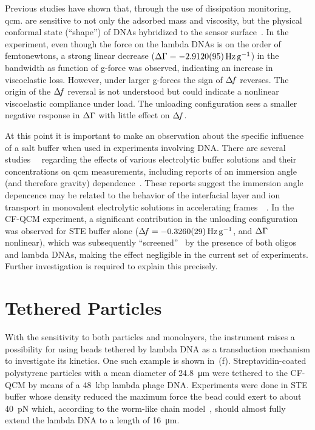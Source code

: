 Previous studies have shown that, through the use of dissipation
monitoring, \gls{qcm}. are sensitive to not only the adsorbed mass and viscosity,
but the physical conformal state (``shape'') of DNAs hybridized to the
sensor surface~\cite{tsortos2008shear}.  In the experiment, even though the
force on the lambda DNAs is on the order of femtonewtons, a strong linear
decrease ($\dg=\SI{-2.912+-0.0095}{\hertz\per\g}$) in the bandwidth as
function of g-force was observed, indicating an increase in viscoelastic
loss.  However, under larger g-forces the sign of $\Delta\!f$ reverses.  The
origin of the $\Delta\!f$ reversal is not understood but could indicate a
nonlinear viscoelastic compliance under load.  The unloading configuration
sees a smaller negative response in $\Delta\Gamma$ with little effect on $\Delta\!f$.

At this point it is important to make an observation about the specific
influence of a salt buffer when used in experiments involving DNA\@.  There
are several studies~\cite{encarnaccao2007influence}~\cite{lin1995role}
regarding the effects of various electrolytic buffer solutions and their
concentrations on \gls{qcm} measurements, including reports of an immersion angle
(and therefore gravity) dependence~\cite{yoshimoto2006characteristics}.  These
reports suggest the immersion angle depencence may be related to the behavior
of the interfacial layer and ion transport in monovalent electrolytic
solutions in accelerating
frames~\cite{tolman1911electromotive}~\cite{des1893unpolarisirbare}.  In the
CF-QCM experiment, a significant contribution in the unloading configuration
was observed for STE buffer alone ($\df=\SI{-0.326+-0.0029}{\hertz\per\g}$,
and $\Delta\Gamma$ nonlinear), which was subsequently
``screened''~\cite{zhang2002insulating} by the presence of both oligos and
lambda DNAs, making the effect negligible in the current set of experiments.
Further investigation is required to explain this precisely.

\section{Tethered Particles}
With the sensitivity to both particles and monolayers, the instrument
raises a possibility for using beads tethered by lambda DNA as a
transduction mechanism to investigate its kinetics.  One such example is
shown in \,(f).  Streptavidin-coated polystyrene
particles with a mean diameter of \SI{24.8}{\micro\meter} were tethered to
the CF-QCM by means of a \SI{48}{kbp} lambda phage DNA\@.  Experiments were
done in STE buffer whose density reduced the maximum force the bead could
exert to about \SI{40}{\pico\newton} which, according to the worm-like
chain model~\cite{marko1995stretching}, should almost fully extend the
lambda DNA to a length of \SI{16}{\micro\meter}.

